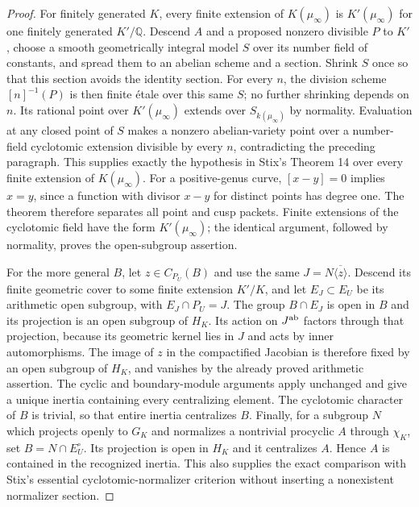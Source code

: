 \documentclass[11pt,oneside]{article}
\begin{document}
\begin{proof}
For finitely generated $K$, every finite extension of $K(\mu_\infty)$
is $K'(\mu_\infty)$ for one finitely generated $K'/\mathbb Q$.
Descend $A$ and a proposed nonzero divisible $P$ to $K'$, choose
a smooth geometrically integral model $S$ over its number field of
constants, and spread them to an abelian scheme and a section.
Shrink $S$ once so that this section avoids the identity section.
For every $n$, the division scheme $[n]^{-1}(P)$ is then finite
\'etale over this same $S$; no further shrinking depends on $n$.
Its rational point over $K'(\mu_\infty)$ extends over
$S_{k(\mu_\infty)}$ by normality. Evaluation at any closed point
of $S$ makes a nonzero abelian-variety point over a number-field
cyclotomic extension divisible by every $n$, contradicting the
preceding paragraph. This supplies exactly the hypothesis in
Stix's Theorem 14 over every finite extension of $K(\mu_\infty)$.
For a positive-genus curve, $[x-y]=0$ implies $x=y$, since a
function with divisor $x-y$ for distinct points has degree one.
The theorem therefore separates all point and cusp
packets. Finite extensions of the cyclotomic field have the form
$K'(\mu_\infty)$; the identical argument, followed by normality,
proves the open-subgroup assertion.

For the more general $B$, let $z\in C_{P_U}(B)$ and use the same
$J=N\overline{\langle z\rangle}$. Descend its finite geometric
cover to some finite extension $K'/K$, and let $E_J\subset E_U$
be its arithmetic open subgroup, with $E_J\cap P_U=J$.
The group $B\cap E_J$ is open in $B$ and its projection is an
open subgroup of $H_K$. Its action on $J^{\rm ab}$ factors through
that projection, because its geometric kernel lies in $J$ and
acts by inner automorphisms. The image of $z$ in the compactified
Jacobian is therefore fixed by an open subgroup of $H_K$, and
vanishes by the already proved arithmetic assertion. The cyclic
and boundary-module arguments apply unchanged and give a unique
inertia containing every centralizing element. The cyclotomic
character of $B$ is trivial, so that entire inertia centralizes $B$.
Finally, for a subgroup $N$ which projects openly to $G_K$ and
normalizes a nontrivial procyclic $A$ through $\chi_K$, set
$B=N\cap E_U^{\circ}$. Its projection is open in $H_K$ and it
centralizes $A$. Hence $A$ is contained in the recognized inertia.
This also supplies the exact comparison with Stix's essential
cyclotomic-normalizer criterion without inserting a nonexistent
normalizer section.
\end{proof}
\end{document}
